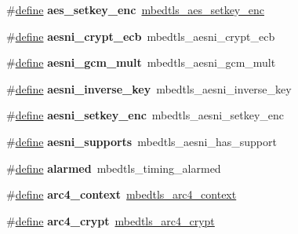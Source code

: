 \begin{DoxyCompactItemize}
\item 
\mbox{\label{compat-1_83_8h_ad65f0c52cd996944d578a41a5c7e2b24}} 
\#\hyperlink{structdefine}{define} {\bfseries aes\+\_\+setkey\+\_\+enc}~\hyperlink{aes_8h_acec17c6592b98876106d035c372b1efa}{mbedtls\+\_\+aes\+\_\+setkey\+\_\+enc}
\item 
\mbox{\label{compat-1_83_8h_a593372a1f266bf3386eaba604d405b76}} 
\#\hyperlink{structdefine}{define} {\bfseries aesni\+\_\+crypt\+\_\+ecb}~mbedtls\+\_\+aesni\+\_\+crypt\+\_\+ecb
\item 
\mbox{\label{compat-1_83_8h_aba44b06e60793789c214951083caf569}} 
\#\hyperlink{structdefine}{define} {\bfseries aesni\+\_\+gcm\+\_\+mult}~mbedtls\+\_\+aesni\+\_\+gcm\+\_\+mult
\item 
\mbox{\label{compat-1_83_8h_aabc641a95604a168a51c352bf6bc6654}} 
\#\hyperlink{structdefine}{define} {\bfseries aesni\+\_\+inverse\+\_\+key}~mbedtls\+\_\+aesni\+\_\+inverse\+\_\+key
\item 
\mbox{\label{compat-1_83_8h_a21304741198078dbb09d71b25c925c89}} 
\#\hyperlink{structdefine}{define} {\bfseries aesni\+\_\+setkey\+\_\+enc}~mbedtls\+\_\+aesni\+\_\+setkey\+\_\+enc
\item 
\mbox{\label{compat-1_83_8h_adf82de77e0748348d87b5ddcafed2501}} 
\#\hyperlink{structdefine}{define} {\bfseries aesni\+\_\+supports}~mbedtls\+\_\+aesni\+\_\+has\+\_\+support
\item 
\mbox{\label{compat-1_83_8h_ad1f27dc155fcc9af286ff1e9f9a727ba}} 
\#\hyperlink{structdefine}{define} {\bfseries alarmed}~mbedtls\+\_\+timing\+\_\+alarmed
\item 
\mbox{\label{compat-1_83_8h_a30de67b85f2861f6048416a4386647c5}} 
\#\hyperlink{structdefine}{define} {\bfseries arc4\+\_\+context}~\hyperlink{structmbedtls__arc4__context}{mbedtls\+\_\+arc4\+\_\+context}
\item 
\mbox{\label{compat-1_83_8h_af9ed5a309fbb51975d454044a2caf4ad}} 
\#\hyperlink{structdefine}{define} {\bfseries arc4\+\_\+crypt}~\hyperlink{arc4_8h_a51d378246f0c277a68352cdac782e8fb}{mbedtls\+\_\+arc4\+\_\+crypt}

\end{DoxyCompactItemize}
